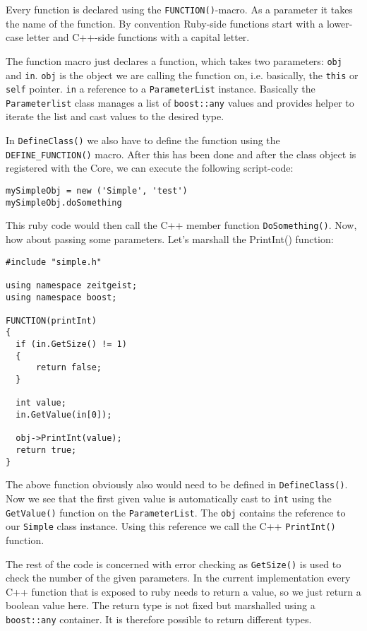 Every function is declared using the \texttt{FUNCTION()}-macro. As a
parameter it takes the name of the function. By convention Ruby-side
functions start with a lower-case letter and C++-side functions with a
capital letter. 

The function macro just declares a function, which takes two
parameters: \texttt{obj} and \texttt{in}. \texttt{obj} is the object
we are calling the function on, i.e. basically, the \texttt{this} or
\texttt{self} pointer. \texttt{in} a reference to a \texttt{ParameterList} 
instance. Basically the \texttt{Parameterlist} class manages a list of
\texttt{boost::any} values and provides helper to iterate the list and cast 
values to the desired type.

In \texttt{DefineClass()} we also have to define the function using
the \texttt{DEFINE\_FUNCTION()} macro. After this has been done and
after the class object is registered with the Core, we can execute the
following script-code:

\begin{verbatim}
mySimpleObj = new ('Simple', 'test')
mySimpleObj.doSomething
\end{verbatim}

This ruby code would then call the C++ member function
\texttt{DoSomething()}. Now, how about passing some parameters. Let's marshall
the PrintInt() function:

\begin{verbatim}
#include "simple.h"

using namespace zeitgeist;
using namespace boost;

FUNCTION(printInt)
{
  if (in.GetSize() != 1)
  {
      return false;
  }

  int value;
  in.GetValue(in[0]);

  obj->PrintInt(value);
  return true;
}
\end{verbatim}

The above function obviously also would need to be defined in
\texttt{DefineClass()}. Now we see that the first given value 
is automatically cast to \texttt{int} using the \texttt{GetValue()}
function on the \texttt{ParameterList}. The \texttt{obj} contains the
reference to our \texttt{Simple} class instance. Using this reference
we call the C++ \texttt{PrintInt()} function.

The rest of the code is concerned with error checking as
\texttt{GetSize()} is used to check the number of the given parameters. 
In the current implementation every C++ function that is exposed to
ruby needs to return a value, so we just return a boolean value
here. The return type is not fixed but marshalled using a
\texttt{boost::any} container. It is therefore possible to return
different types.

